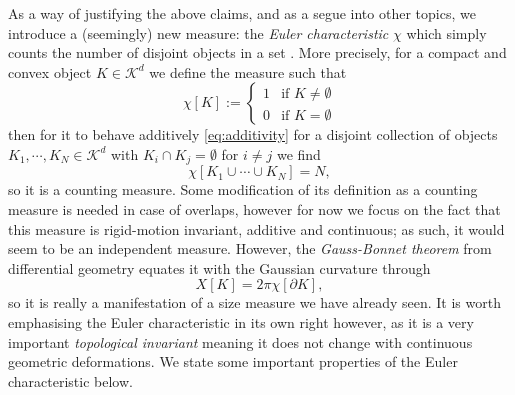 As a way of justifying the above claims, and as a segue into other topics, we introduce a (seemingly) new measure: the \emph{Euler characteristic} $\chi$ which simply counts the number of disjoint objects in a set%
.
More precisely, for a compact and convex object $K \in \mathcal{K}^d$ we define the measure such that
\begin{equation}\label{eq:euler-characteristic-definition}
  \chi[K] :=
  \begin{cases}
    1 & \textrm{if } K \ne \emptyset \\
    0 & \textrm{if } K = \emptyset
  \end{cases}
\end{equation}
then for it to behave additively \eqref{eq:additivity} for a disjoint collection of objects $K_1, \cdots, K_N \in \mathcal{K}^d$ with $K_i \cap K_j = \emptyset$ for $i \ne j$ we find
\begin{equation*}
  \chi[K_1 \cup \cdots \cup K_N] = N,
\end{equation*}
so it is a counting measure.
Some modification of its definition as a counting measure is needed in case of overlaps, however for now we focus on the fact that this measure is rigid-motion invariant, additive and continuous; as such, it would seem to be an independent measure.
However, the \emph{Gauss-Bonnet theorem} from differential geometry equates it with the Gaussian curvature through
\begin{equation}\label{eq:gauss-bonnet}
  X[K] = 2\pi \chi[\partial K],
\end{equation}
so it is really a manifestation of a size measure we have already seen.
It is worth emphasising the Euler characteristic in its own right however, as it is a very important \emph{topological invariant} meaning it does not change with continuous geometric deformations.
We state some important properties of the Euler characteristic below.

